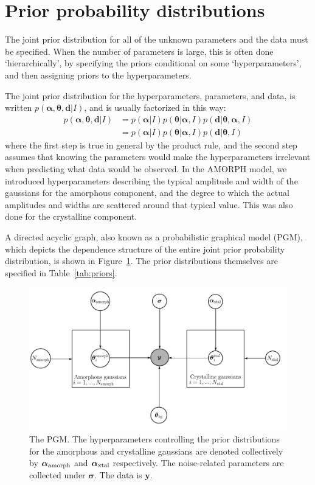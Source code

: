 \documentclass[review]{elsarticle}
\newcommand{\hypers}{\boldsymbol{\alpha}}
\newcommand{\params}{\boldsymbol{\theta}}
\newcommand{\data}{\boldsymbol{d}}
\newcommand{\info}{I}
\begin{document}
\section{Prior probability distributions}\label{sec:priors}
The joint prior distribution for all of the unknown parameters and
the data must be specified.
When the number of parameters is large, this is often done `hierarchically', by
specifying the priors conditional on some `hyperparameters', and then assigning
priors to the hyperparameters.

The joint prior distribution for
the hyperparameters, parameters, and data,
is written $p(\hypers, \params, \data | \info)$, and is usually factorized
in this way:
\begin{align}
p(\hypers, \params, \data | \info) &=
    p(\hypers | \info)p(\params | \hypers, \info)
    p(\data | \params, \hypers, \info)\\
    &= p(\hypers | \info)p(\params | \hypers, \info)
    p(\data | \params, \info)
\end{align}
where the first step is true in general by the product rule, and the second
step assumes that knowing the parameters would make the hyperparameters
irrelevant when predicting what data would be observed. In the AMORPH model,
we introduced hyperparameters describing the typical amplitude
and width of the gaussians for the amorphous component, and
the degree to which the actual amplitudes and widths are scattered
around that typical value. This was also done for the crystalline
component.

A directed acyclic graph, also known as a probabilistic graphical model (PGM),
which depicts the dependence structure of the entire joint
prior probability distribution,
is shown in Figure~\ref{fig:pgm-edited}. The prior distributions themselves
are specified in Table~\ref{tab:priors}.

\begin{figure}[!ht]
\centering
\includegraphics[scale=0.7]{figures/pgm-edited.pdf}
\caption{The PGM. The hyperparameters controlling the prior distributions
for the amorphous and crystalline gaussians are denoted collectively
by $\boldsymbol{\alpha}_{\rm amorph}$ and
$\boldsymbol{\alpha}_{\rm xtal}$ respectively.
The noise-related parameters are collected under $\boldsymbol{\sigma}$.
The data is $\boldsymbol{y}$.\label{fig:pgm-edited}}
\end{figure}
\end{document}

